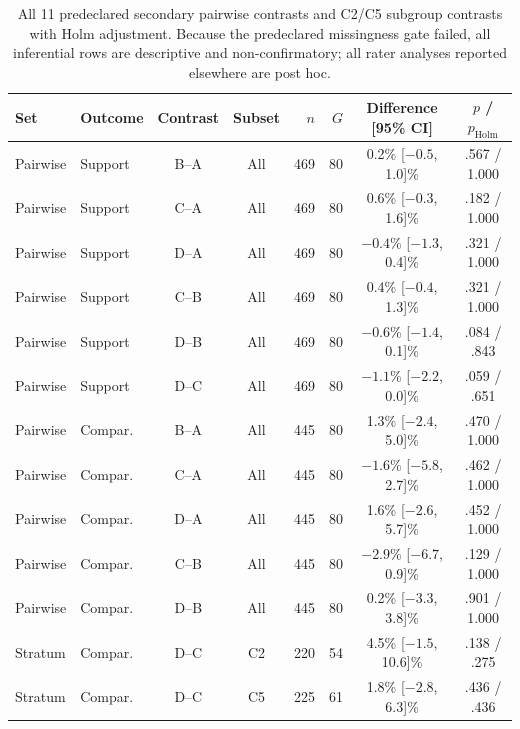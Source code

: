 \begin{table}[t]
\centering\scriptsize
\setlength{\tabcolsep}{3pt}
\caption{All 11 predeclared secondary pairwise contrasts and C2/C5 subgroup contrasts with Holm adjustment. Because the predeclared missingness gate failed, all inferential rows are descriptive and non-confirmatory; all rater analyses reported elsewhere are post hoc.}
\label{tab:v3-secondary-results}
\begin{tabular}{llccrrcc}
\toprule
Set & Outcome & Contrast & Subset & $n$ & $G$ & Difference [95\% CI] & $p$ / $p_{\mathrm{Holm}}$ \\
\midrule
Pairwise & Support & B--A & All & 469 & 80 & 0.2\% [$-0.5$, 1.0]\% & .567 / 1.000 \\
Pairwise & Support & C--A & All & 469 & 80 & 0.6\% [$-0.3$, 1.6]\% & .182 / 1.000 \\
Pairwise & Support & D--A & All & 469 & 80 & $-0.4$\% [$-1.3$, 0.4]\% & .321 / 1.000 \\
Pairwise & Support & C--B & All & 469 & 80 & 0.4\% [$-0.4$, 1.3]\% & .321 / 1.000 \\
Pairwise & Support & D--B & All & 469 & 80 & $-0.6$\% [$-1.4$, 0.1]\% & .084 / .843 \\
Pairwise & Support & D--C & All & 469 & 80 & $-1.1$\% [$-2.2$, 0.0]\% & .059 / .651 \\
Pairwise & Compar. & B--A & All & 445 & 80 & 1.3\% [$-2.4$, 5.0]\% & .470 / 1.000 \\
Pairwise & Compar. & C--A & All & 445 & 80 & $-1.6$\% [$-5.8$, 2.7]\% & .462 / 1.000 \\
Pairwise & Compar. & D--A & All & 445 & 80 & 1.6\% [$-2.6$, 5.7]\% & .452 / 1.000 \\
Pairwise & Compar. & C--B & All & 445 & 80 & $-2.9$\% [$-6.7$, 0.9]\% & .129 / 1.000 \\
Pairwise & Compar. & D--B & All & 445 & 80 & 0.2\% [$-3.3$, 3.8]\% & .901 / 1.000 \\
Stratum & Compar. & D--C & C2 & 220 & 54 & 4.5\% [$-1.5$, 10.6]\% & .138 / .275 \\
Stratum & Compar. & D--C & C5 & 225 & 61 & 1.8\% [$-2.8$, 6.3]\% & .436 / .436 \\
\bottomrule
\end{tabular}
\end{table}
